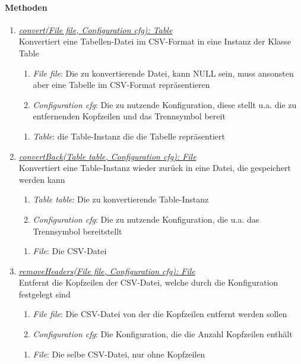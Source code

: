 \paragraph{Methoden}

\begin{enumerate}[+]
	\item \underline{\textit{convert(File file, Configuration cfg): Table}} \\
	Konvertiert eine Tabellen-Datei im CSV-Format in eine Instanz der Klasse Table
	
	\begin{enumerate}[$\bullet$]
		\item \textit{File file}: Die zu konvertierende Datei, kann NULL sein, muss ansonsten aber eine Tabelle im CSV-Format repräsentieren
		\item \textit{Configuration cfg}: Die zu nutzende Konfiguration, diese stellt u.a. die zu entfernenden Kopfzeilen und das Trennsymbol bereit
	\end{enumerate}
	\vspace{-0.2cm}
	\begin{enumerate}[$\circ$]
		\item \textit{Table}: die Table-Instanz die die Tabelle repräsentiert
	\end{enumerate}
	
	\item \underline{\textit{convertBack(Table table, Configuration cfg): File}} \\
	Konvertiert eine Table-Instanz wieder zurück in eine Datei, die gespeichert werden kann
	\begin{enumerate}[$\bullet$]
		\item \textit{Table table}: Die zu konvertierende Table-Instanz
		\item \textit{Configuration cfg}: Die zu nutzende Konfiguration, die u.a. das Trennsymbol bereitstellt
	\end{enumerate}
	\vspace{-0.2cm}
	\begin{enumerate}[$\circ$]
		\item \textit{File}: Die CSV-Datei
	\end{enumerate}

	\item \underline{\textit{removeHeaders(File file, Configuration cfg): File}} \\
	Entfernt die Kopfzeilen der CSV-Datei, welche durch die Konfiguration festgelegt sind
	\begin{enumerate}[$\bullet$]
		\item \textit{File file}: Die CSV-Datei von der die Kopfzeilen entfernt werden sollen
		\item \textit{Configuration cfg}: Die Konfiguration, die die Anzahl Kopfzeilen enthält
	\end{enumerate}
	\vspace{-0.2cm}
	\begin{enumerate}[$\circ$]
		\item \textit{File}: Die selbe CSV-Datei, nur ohne Kopfzeilen
	\end{enumerate}
\end{enumerate}

